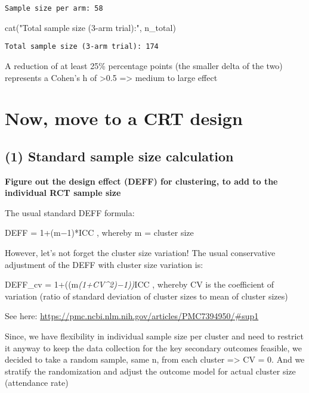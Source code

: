 \documentclass[
  letterpaper,
  DIV=11,
  numbers=noendperiod]{scrartcl}
\newenvironment{Shaded}{\begin{snugshade}}{\end{snugshade}}
\newcommand{\FunctionTok}[1]{\textcolor[rgb]{0.28,0.35,0.67}{#1}}
\newcommand{\NormalTok}[1]{\textcolor[rgb]{0.00,0.23,0.31}{#1}}
\newcommand{\StringTok}[1]{\textcolor[rgb]{0.13,0.47,0.30}{#1}}
\begin{document}
\begin{verbatim}
Sample size per arm: 58 
\end{verbatim}

\begin{Shaded}
\begin{Highlighting}[]
\FunctionTok{cat}\NormalTok{(}\StringTok{"Total sample size (3{-}arm trial):"}\NormalTok{, n\_total)}
\end{Highlighting}
\end{Shaded}

\begin{verbatim}
Total sample size (3-arm trial): 174
\end{verbatim}

A reduction of at least 25\% percentage points (the smaller delta of the
two) represents a Cohen's h of \textgreater0.5 =\textgreater{} medium to
large effect

\section{Now, move to a CRT design}\label{now-move-to-a-crt-design}

\subsection{\texorpdfstring{\textbf{(1) Standard sample size
calculation}}{(1) Standard sample size calculation}}\label{standard-sample-size-calculation}

\textbf{Figure out the design effect (DEFF) for clustering, to add to
the individual RCT sample size}

The usual standard DEFF formula:

DEFF = 1+(m−1)*ICC , whereby m = cluster size

However, let's not forget the cluster size variation! The usual
conservative adjustment of the DEFF with cluster size variation is:

DEFF\_cv = 1+((m\emph{(1+CV\^{}2)−1))}ICC , whereby CV is the
coefficient of variation (ratio of standard deviation of cluster sizes
to mean of cluster sizes)

See here:
\hyperref[0]{https://pmc.ncbi.nlm.nih.gov/articles/PMC7394950/\#sup1}

Since, we have flexibility in individual sample size per cluster and
need to restrict it anyway to keep the data collection for the key
secondary outcomes feasible, we decided to take a random sample, same n,
from each cluster =\textgreater{} CV = 0. And we stratify the
randomization and adjust the outcome model for actual cluster size
(attendance rate)
\end{document}
